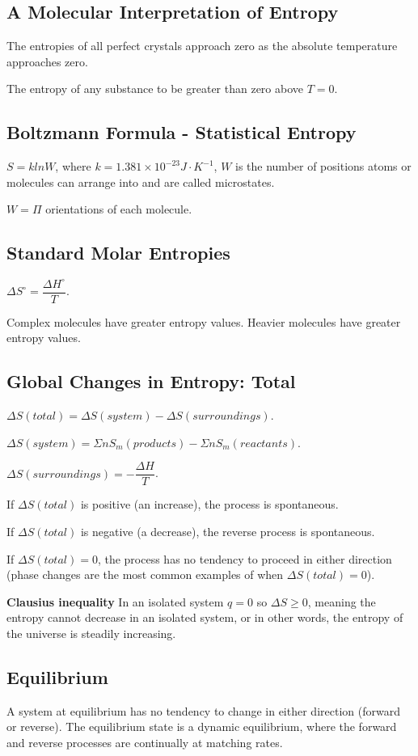 \documentclass[a4paper,12pt]{article}
\begin{document}
\subsection{A Molecular Interpretation of Entropy}
The entropies of all perfect crystals approach zero as the absolute temperature approaches zero.\par
The entropy of any substance to be greater than zero above $T = 0$.
\subsection{Boltzmann Formula - Statistical Entropy}
$S=klnW$, where $k = 1.381 \times 10^{-23} J\cdot K^{-1}$, $W$ is the number of positions atoms or molecules can arrange into and are called microstates.\par
$W=\Pi$ orientations of each molecule.
\subsection{Standard Molar Entropies}
$\Delta S^{\circ}=\dfrac{\Delta H^{\circ}}{T}$.\par
Complex molecules have greater entropy values. Heavier molecules have greater entropy values.
\subsection{Global Changes in Entropy: Total}
$\Delta S(total)=\Delta S (system)-\Delta S(surroundings)$.\par
$\Delta S(system)=\Sigma nS_{m}(products)-\Sigma nS_{m}(reactants)$.\par
$\Delta S(surroundings)=-\dfrac{\Delta H}{T}$.\par
If $\Delta S(total)$ is positive (an increase), the process is spontaneous.\par
If $\Delta S(total)$ is negative (a decrease), the reverse process is spontaneous.\par
If $\Delta S(total) = 0$, the process has no tendency to proceed in either direction (phase changes are the most common examples of when $\Delta S(total) = 0$).\par
\textbf{Clausius inequality} In an isolated system $q=0$ so $\Delta S\geq0$, meaning the entropy cannot decrease in an isolated system, or in other words, the entropy of the universe is steadily increasing.
\subsection{Equilibrium}
A system at equilibrium has no tendency to change in either direction (forward or reverse).
The equilibrium state is a dynamic equilibrium, where the forward and reverse processes are continually at matching rates.
\end{document}
